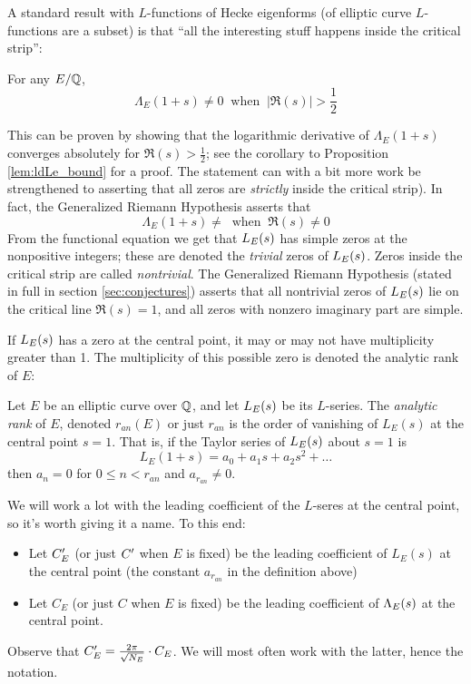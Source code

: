 A standard result with $L$-functions of Hecke eigenforms (of elliptic curve $L$-functions are a subset) is that ``all the interesting stuff happens inside the critical strip'':
\begin{proposition}
For any $E/\mathbb{Q}$,
\begin{equation}
\Lambda_E(1+s) \ne 0 \;\;\mbox{when}\;\; |\Re(s)| > \frac{1}{2}
\end{equation}
\end{proposition}
This can be proven by showing that the logarithmic derivative of $\Lambda_E(1+s)$ converges absolutely for $\Re(s) > \frac{1}{2}$; see the corollary to Proposition \ref{lem:ldLe_bound} for a proof. The statement can with a bit more work be strengthened to asserting that all zeros are {\it strictly} inside the critical strip). In fact, the Generalized Riemann Hypothesis asserts that
\begin{equation}
\Lambda_E(1+s) \ne  \;\;\mbox{when}\;\; \Re(s) \neq 0
\end{equation}
From the functional equation we get that $L_E(s)$ has simple zeros at the nonpositive integers; these are denoted the {\it trivial} zeros of $L_E(s)$. Zeros inside the critical strip are called {\it nontrivial}. The Generalized Riemann Hypothesis (stated in full in section \ref{sec:conjectures}) asserts that all nontrivial zeros of $L_E(s)$ lie on the critical line $\Re(s)=1$, and all zeros with nonzero imaginary part are simple. 

If $L_E(s)$ has a zero at the central point, it may or may not have multiplicity greater than 1. The multiplicity of this possible zero is denoted the analytic rank of $E$:
\begin{definition}
Let $E$ be an elliptic curve over $\mathbb{Q}$, and let $L_E(s)$ be its $L$-series. The {\it analytic rank} of $E$, denoted $r_{an}(E)$ or just $r_{an}$ is the order of vanishing of $L_E(s)$ at the central point $s=1$. That is, if the Taylor series of $L_E(s)$ about $s=1$ is
\begin{equation}
L_E(1+s) = a_0 + a_1 s + a_2 s^2 + \ldots
\end{equation}
then $a_n = 0$ for $0 \le n < r_{an}$ and $a_{r_{an}} \ne 0$.
\end{definition}
We will work a lot with the leading coefficient of the $L$-seres at the central point, so it's worth giving it a name. To this end:
\begin{definition} \mbox{}
\begin{itemize}
\item Let $C^{\prime}_E$ (or just $C^{\prime}$ when $E$ is fixed) be the leading coefficient of $L_E(s)$ at the central point (the constant $a_{r_{an}}$ in the definition above)
\item Let $C_E$ (or just $C$ when $E$ is fixed) be the leading coefficient of $\Lambda_E(s)$ at the central point.
\end{itemize}
\end{definition}
Observe that $C^{\prime}_E = \frac{2\pi}{\sqrt{N_E}}\cdot C_E$. We will most often work with the latter, hence the notation. \\

